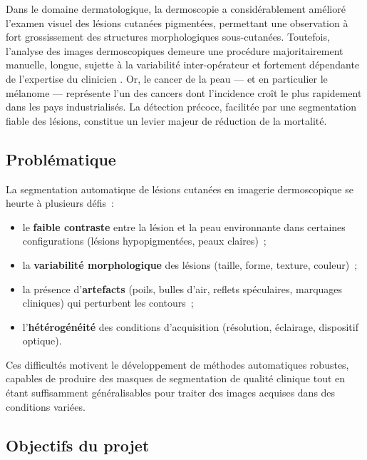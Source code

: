\documentclass[12pt,a4paper]{article}
\begin{document}
Dans le domaine dermatologique, la dermoscopie a considérablement amélioré l'examen visuel des lésions cutanées pigmentées, permettant une observation à fort grossissement des structures morphologiques sous-cutanées. Toutefois, l'analyse des images dermoscopiques demeure une procédure majoritairement manuelle, longue, sujette à la variabilité inter-opérateur et fortement dépendante de l'expertise du clinicien \citep{codella2018skin}. Or, le cancer de la peau --- et en particulier le mélanome --- représente l'un des cancers dont l'incidence croît le plus rapidement dans les pays industrialisés. La détection précoce, facilitée par une segmentation fiable des lésions, constitue un levier majeur de réduction de la mortalité.

\subsection{Problématique}

La segmentation automatique de lésions cutanées en imagerie dermoscopique se heurte à plusieurs défis~:
\begin{itemize}[nosep]
    \item le \textbf{faible contraste} entre la lésion et la peau environnante dans certaines configurations (lésions hypopigmentées, peaux claires)~;
    \item la \textbf{variabilité morphologique} des lésions (taille, forme, texture, couleur)~;
    \item la présence d'\textbf{artefacts} (poils, bulles d'air, reflets spéculaires, marquages cliniques) qui perturbent les contours~;
    \item l'\textbf{hétérogénéité} des conditions d'acquisition (résolution, éclairage, dispositif optique).
\end{itemize}

Ces difficultés motivent le développement de méthodes automatiques robustes, capables de produire des masques de segmentation de qualité clinique tout en étant suffisamment généralisables pour traiter des images acquises dans des conditions variées.

\subsection{Objectifs du projet}
\end{document}
